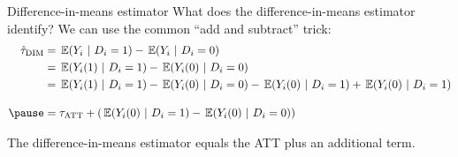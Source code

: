 \documentclass[aspectratio=169,t,11pt,table]{beamer}
\begin{document}
% 
% 
% 
%   

\begin{frame}{Difference-in-means estimator}
  What does the difference-in-means estimator identify? We can use the common ``add and subtract'' trick:
  \begin{align*}
    \hat{\tau}_{\text{DIM}} &= \expec{Y_{i}}{D_i = 1} - \expec{Y_{i}}{D_i = 0} \\
    &= \expec{Y_{i}(1)}{D_i = 1} - \expec{Y_{i}(0)}{D_i = 0} \\
    &= \expec{Y_{i}(1)}{D_i = 1} - \expec{Y_{i}(0)}{D_i = 0} - \expec{Y_{i}(0)}{D_i = 1} + \expec{Y_{i}(0)}{D_i = 1} \\[1em]
    \pause
    &= \tau_{\text{ATT}} + \left( \expec{Y_{i}(0)}{D_i = 1} - \expec{Y_{i}(0)}{D_i = 0} \right)
  \end{align*}  

  \bigskip
  The difference-in-means estimator equals the ATT plus an additional term.
\end{frame}
\end{document}
